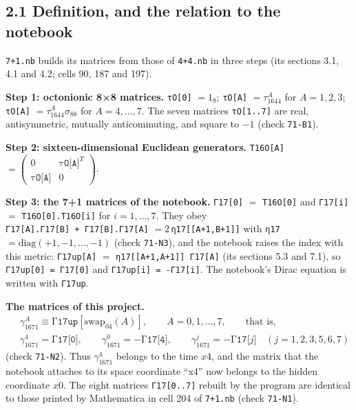 \documentclass[
  10pt,
]{article}
\begin{document}
\hypertarget{definition-and-the-relation-to-the-notebook}{%
\subsection{2.1 Definition, and the relation to the
notebook}\label{definition-and-the-relation-to-the-notebook}}

\texttt{7+1.nb} builds its matrices from those of \texttt{4+4.nb} in
three steps (its sections 3.1, 4.1 and 4.2; cells 90, 187 and 197).

\textbf{Step 1: octonionic 8×8 matrices.} \texttt{τO{[}0{]}} \(=1_8\);
\texttt{τO{[}A{]}} \(=\tau_{1644}^A\) for \(A=1,2,3\);
\texttt{τO{[}A{]}} \(=\tau_{1644}^A\sigma_{88}\) for \(A=4,\dots,7\).
The seven matrices \texttt{τO{[}1..7{]}} are real, antisymmetric,
mutually anticommuting, and square to \(-1\) (check \texttt{71-B1}).

\textbf{Step 2: sixteen-dimensional Euclidean generators.}
\texttt{T16O{[}A{]}}
\(=\begin{pmatrix}0&\texttt{τO[A]}^T\\\texttt{τO[A]}&0\end{pmatrix}\).

\textbf{Step 3: the 7+1 matrices of the notebook.} \texttt{Γ17{[}0{]}}
\(=\) \texttt{T16O{[}0{]}} and \texttt{Γ17{[}i{]}} \(=\)
\texttt{T16O{[}0{]}.T16O{[}i{]}} for \(i=1,\dots,7\). They obey
\texttt{Γ17{[}A{]}.Γ17{[}B{]}\ +\ Γ17{[}B{]}.Γ17{[}A{]}}
\(=2\,\)\texttt{η17{[}{[}A+1,B+1{]}{]}} with \texttt{η17}
\(=\mathrm{diag}(+1,-1,\dots,-1)\) (check \texttt{71-N3}), and the
notebook raises the index with this metric: \texttt{Γ17up{[}A{]}} \(=\)
\texttt{η17{[}{[}A+1,A+1{]}{]}\ Γ17{[}A{]}} (its sections 5.3 and 7.1),
so \texttt{Γ17up{[}0{]}\ =\ Γ17{[}0{]}} and
\texttt{Γ17up{[}i{]}\ =\ -Γ17{[}i{]}}. The notebook's Dirac equation is
written with \texttt{Γ17up}.

\textbf{The matrices of this project.} \[\boxed{\;\begin{aligned}
&\gamma_{1671}^A\equiv\texttt{Γ17up}[\mathrm{swap}_{04}(A)],\qquad A=0,1,\dots,7,\qquad\text{that is,}\\
&\gamma_{1671}^4=\texttt{Γ17[0]},\qquad\gamma_{1671}^0=-\texttt{Γ17[4]},\qquad\gamma_{1671}^j=-\texttt{Γ17[}j\texttt{]}\quad(j=1,2,3,5,6,7)
\end{aligned}\;}\tag{2.1}\] (check \texttt{71-N2}). Thus
\(\gamma_{1671}^4\) belongs to the time \(x4\), and the matrix that the
notebook attaches to its space coordinate ``x4'' now belongs to the
hidden coordinate \(x0\). The eight matrices \texttt{Γ17{[}0..7{]}}
rebuilt by the program are identical to those printed by Mathematica in
cell 204 of \texttt{7+1.nb} (check \texttt{71-N1}).
\end{document}
